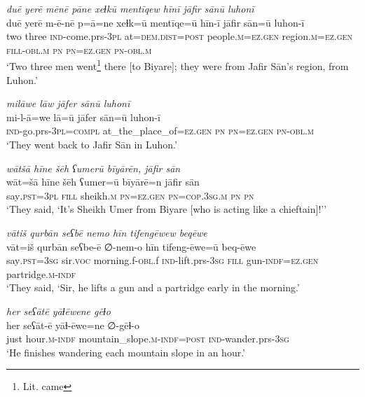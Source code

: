 \ea \label{ŠJ.9}
\textit{duē yerē mēnē pāne xeɫkū mentīqew hīnī jāfir sānū luhonī} \\ 
\gll duē yerē m-ē-nē p=ā=ne xeɫk=ū mentīqe=ū hīn-ī jāfir sān=ū luhon-ī \\ 
 two three \textsc{ind-}come.prs\textsc{-3pl} at=\textsc{dem.dist}\textsc{=\textsc{post}} people\textsc{.m}\textsc{=ez.gen} region\textsc{.m}\textsc{=ez.gen} \textsc{fill}\textsc{-obl}\textsc{.m} \textsc{pn} \textsc{pn}\textsc{=ez.gen} \textsc{pn}\textsc{-obl}\textsc{.m} \\ 
\glt `Two three men went\footnote{Lit. came} there [to Biyare]; they were from Jafir Sān’s region, from Luhon.'
\z 
 
\ea \label{ŠJ.13}
\textit{milāwe lāw jāfer sānū luhonī} \\ 
\gll mi-l-ā=we lā=ū jāfer sān=ū luhon-ī \\ 
 \textsc{ind-}go.prs\textsc{-3pl}\textsc{=compl} at\_the\_place\_of\textsc{=ez.gen} \textsc{pn} \textsc{pn}\textsc{=ez.gen} \textsc{pn}\textsc{-obl}\textsc{.m} \\ 
\glt `They went back to Jafir Sān in Luhon.'
\z 
 
\ea \label{ŠJ.15}
\textit{wātšā hīne šēh ʕumerū bīyārēn, jāfir sān} \\ 
\gll wāt=šā hīne šēh ʕumer=ū bīyārē=n jāfir sān \\ 
 say\textsc{.pst}\textsc{=3pl} \textsc{fill} sheikh\textsc{.m} \textsc{pn}\textsc{=ez.gen} \textsc{pn}\textsc{=cop}\textsc{.3sg}\textsc{.m} \textsc{pn} \textsc{pn} \\ 
\glt `They said, ‘It’s Sheikh Umer from Biyare [who is acting like a chieftain]!’'
\z 
 
\ea \label{ŠJ.17}
\textit{vātiš qurbān seʕbē nemo hīn tifengēwew beqēwe} \\ 
\gll vāt=iš qurbān seʕbe-ē ∅-nem-o hīn tifeng-ēwe=ū beq-ēwe \\ 
 say\textsc{.pst}\textsc{=3sg} sir.\textsc{voc} morning.f\textsc{-obl}.f \textsc{ind-}lift.prs\textsc{-3sg} \textsc{fill} gun\textsc{-indf}\textsc{=ez.gen} partridge\textsc{.m}\textsc{-indf} \\ 
\glt `They said, ‘Sir, he lifts a gun and a partridge early in the morning.'
\z 
 
\ea \label{ŠJ.18}
\textit{her seʕātē yāɫēwene gēɫo} \\ 
\gll her seʕāt-ē yāɫ-ēwe=ne ∅-gēɫ-o \\ 
 just hour\textsc{.m}\textsc{-indf} mountain\_slope\textsc{.m}\textsc{-indf}\textsc{=\textsc{post}} \textsc{ind-}wander.prs\textsc{-3sg} \\ 
\glt `He finishes wandering each mountain slope  in an hour.'
\z 
 
